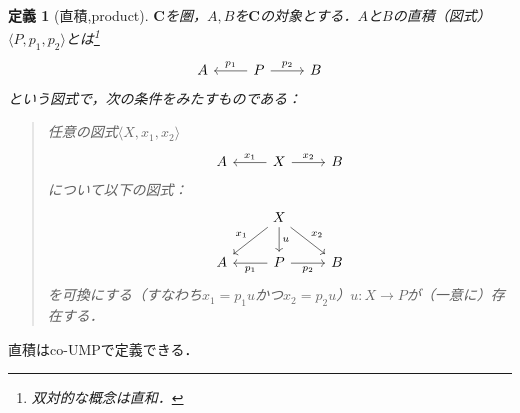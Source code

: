 \documentclass[dvipdfmx,a4j,10pt]{jsarticle}
\theoremstyle{mystyle1}
\newtheorem{dfn}{定義}[section]
\theoremstyle{mystyle2}
\begin{document}
\begin{dfn}[直積,product]
	$\mathbf{C}$を圏，$A,B$を$\mathbf{C}$の対象とする．$A$と$B$の直積（図式）$\langle P,p_1,p_2\rangle$とは\footnote{双対的な概念は直和．}
	\begin{equation}
		\begin{tikzcd}
			A & P \arrow[l,"p_1"'] \arrow[r,"p_2"] & B
		\end{tikzcd}
	\end{equation}
	という図式\footnotemark で，次の条件をみたすものである：
	\begin{quote}
		任意の図式$\langle X,x_1,x_2\rangle$
		\begin{equation}
			\begin{tikzcd}
				A & X \arrow[l,"x_1"'] \arrow[r,"x_2"] & B
			\end{tikzcd}
		\end{equation}
		について以下の図式：
		\begin{equation}
			\begin{tikzcd}
				& X \arrow[ld,"x_1"'] \arrow[d,"u"] \arrow[rd,"x_2"] & \\
				A & P \arrow[l,"p_1"] \arrow[r,"p_2"'] & B
			\end{tikzcd}
		\end{equation}
		を可換にする（すなわち$x_1=p_1u$かつ$x_2=p_2u$）$u:X\to P$が（一意に）存在する．
	\end{quote}
\end{dfn}

直積はco-UMPで定義できる．
\end{document}
